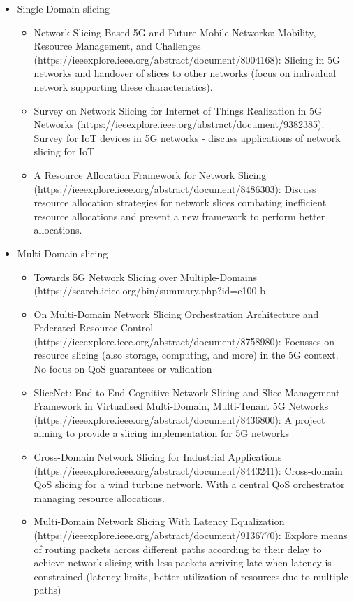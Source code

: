 \documentclass{article}
\begin{document}
\begin{itemize}
\begin{itemize}
    \end{itemize}
    \item Single-Domain slicing
    \begin{itemize}
        \item Network Slicing Based 5G and Future Mobile Networks: Mobility, Resource Management, and Challenges (https://ieeexplore.ieee.org/abstract/document/8004168): Slicing in 5G networks and handover of slices to other networks (focus on individual network supporting these characteristics).
        \item Survey on Network Slicing for Internet of Things Realization in 5G Networks (https://ieeexplore.ieee.org/abstract/document/9382385): Survey for IoT devices in 5G networks - discuss applications of network slicing for IoT
        \item A Resource Allocation Framework for Network Slicing (https://ieeexplore.ieee.org/abstract/document/8486303): Discuss resource allocation strategies for network slices combating inefficient resource allocations and present a new framework to perform better allocations.
    \end{itemize}
    \item Multi-Domain slicing
    \begin{itemize}
        \item Towards 5G Network Slicing over Multiple-Domains (https://search.ieice.org/bin/summary.php?id=e100-b%
        \item On Multi-Domain Network Slicing Orchestration Architecture and Federated Resource Control (https://ieeexplore.ieee.org/abstract/document/8758980): Focusses on resource slicing (also storage, computing, and more) in the 5G context. No focus on QoS guarantees or validation
        \item SliceNet: End-to-End Cognitive Network Slicing and Slice Management Framework in Virtualised Multi-Domain, Multi-Tenant 5G Networks (https://ieeexplore.ieee.org/abstract/document/8436800): A project aiming to provide a slicing implementation for 5G networks
        \item Cross-Domain Network Slicing for Industrial Applications (https://ieeexplore.ieee.org/abstract/document/8443241): Cross-domain QoS slicing for a wind turbine network. With a central QoS orchestrator managing resource allocations.
        \item Multi-Domain Network Slicing With Latency Equalization (https://ieeexplore.ieee.org/abstract/document/9136770): Explore means of routing packets across different paths according to their delay to achieve network slicing with less packets arriving late when latency is constrained (latency limits, better utilization of resources due to multiple paths)

\end{itemize}
\end{itemize}
\end{document}
